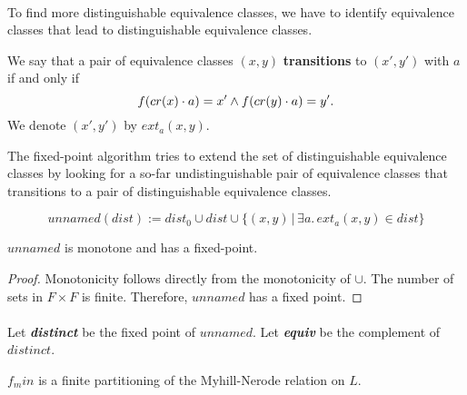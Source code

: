 \documentclass[11pt,a4paper,oneside]{book}
\begin{document}
            \paragraph{}
                To find more distinguishable equivalence classes, we have to identify equivalence classes that lead to distinguishable equivalence classes. 
                \begin{definition}
                    We say that a pair of equivalence classes $(x,y)$ \textbf{transitions} to $(x', y')$ with $a$ if and only if
                    \[
                        f (cr(x)\cdot a) = x' \wedge f (cr(y) \cdot a) = y'.
                    \]
                    We denote $(x', y')$ by $ext_a(x,y)$.
                \end{definition}

                The fixed-point algorithm tries to extend the set of distinguishable equivalence classes by looking for a so-far undistinguishable pair of equivalence classes that transitions to a pair of distinguishable equivalence classes.

                \begin{definition}
                    \[
                        unnamed(dist) := dist_0 \cup dist \cup \{ (x,y) \, | \, \exists a. \, ext_a(x,y) \in dist\}
                    \]
                \end{definition}

                \begin{lemma}
                    \label{dist_monotone}
                    $unnamed$ is monotone and has a fixed-point.
                \end{lemma}
                \begin{proof}
                    Monotonicity follows directly from the monotonicity of $\cup$. 
                    The number of sets in $F \times F$ is finite. 
                    Therefore, $unnamed$ has a fixed point.

                \end{proof}
                \paragraph{}
                    Let \textit{\textbf{distinct}} be the fixed point of $unnamed$.
                    Let \textit{\textbf{equiv}} be the complement of $distinct$.
                    \begin{theorem}
                        \label{MN_MIN}
                        $f_min$ is a finite partitioning of the Myhill-Nerode relation on $L$.
                    \end{theorem}
\end{document}
